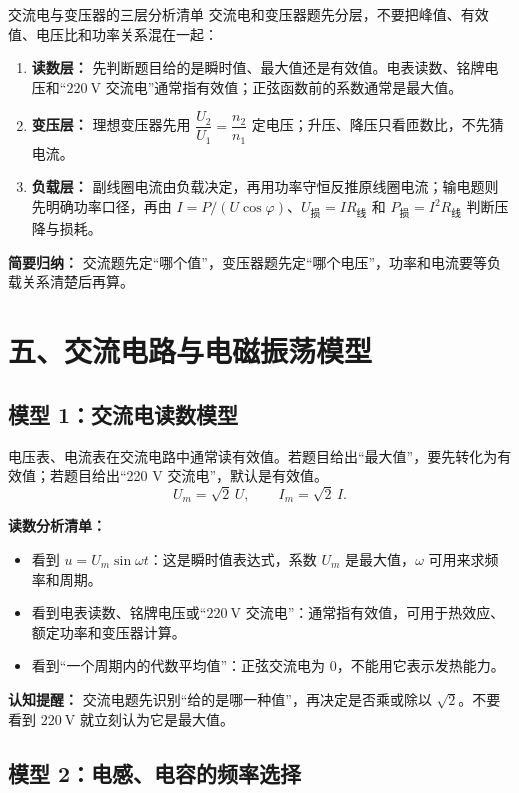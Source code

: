 \begin{learningbox}{交流电与变压器的三层分析清单}
交流电和变压器题先分层，不要把峰值、有效值、电压比和功率关系混在一起：
\begin{enumerate}
  \item \textbf{读数层：} 先判断题目给的是瞬时值、最大值还是有效值。电表读数、铭牌电压和“$220\ \mathrm{V}$ 交流电”通常指有效值；正弦函数前的系数通常是最大值。
  \item \textbf{变压层：} 理想变压器先用 $\dfrac{U_2}{U_1}=\dfrac{n_2}{n_1}$ 定电压；升压、降压只看匝数比，不先猜电流。
  \item \textbf{负载层：} 副线圈电流由负载决定，再用功率守恒反推原线圈电流；输电题则先明确功率口径，再由 $I=P/(U\cos\varphi)$、$U_{\text{损}}=IR_{\text{线}}$ 和 $P_{\text{损}}=I^2R_{\text{线}}$ 判断压降与损耗。
\end{enumerate}
\textbf{简要归纳：} 交流题先定“哪个值”，变压器题先定“哪个电压”，功率和电流要等负载关系清楚后再算。
\end{learningbox}

\section*{五、交流电路与电磁振荡模型}

\subsection*{模型 1：交流电读数模型}

电压表、电流表在交流电路中通常读有效值。若题目给出“最大值”，要先转化为有效值；若题目给出“220 V 交流电”，默认是有效值。
\[
U_m=\sqrt2\,U,\qquad I_m=\sqrt2\,I.
\]

\textbf{读数分析清单：}
\begin{itemize}
  \item 看到 $u=U_m\sin\omega t$：这是瞬时值表达式，系数 $U_m$ 是最大值，$\omega$ 可用来求频率和周期。
  \item 看到电表读数、铭牌电压或“$220\ \mathrm{V}$ 交流电”：通常指有效值，可用于热效应、额定功率和变压器计算。
  \item 看到“一个周期内的代数平均值”：正弦交流电为 0，不能用它表示发热能力。
\end{itemize}

\textbf{认知提醒：} 交流电题先识别“给的是哪一种值”，再决定是否乘或除以 $\sqrt2$。不要看到 $220\ \mathrm{V}$ 就立刻认为它是最大值。

\subsection*{模型 2：电感、电容的频率选择}

